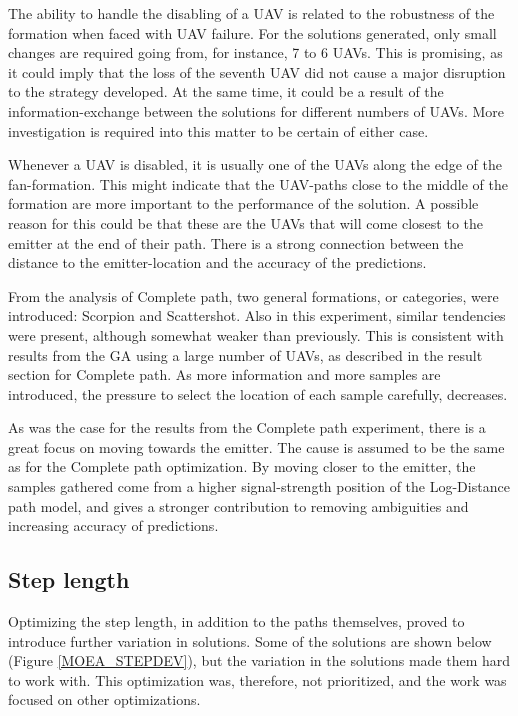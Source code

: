 \documentclass[10pt,a4paper]{book}
\begin{document}
The ability to handle the disabling of a \gls{UAV} is related to the robustness of the formation when faced with \gls{UAV} failure. For the solutions generated, only small changes are required going from, for instance, 7 to 6 \glspl{UAV}. This is promising, as it could imply that the loss of the seventh \gls{UAV} did not cause a major disruption to the strategy developed. At the same time, it could be a result of the information-exchange between the solutions for different numbers of \glspl{UAV}. More investigation is required into this matter to be certain of either case. 

Whenever a \gls{UAV} is disabled, it is usually one of the \glspl{UAV} along the edge of the fan-formation. This might indicate that the \gls{UAV}-paths close to the middle of the formation are more important to the performance of the solution. A possible reason for this could be that these are the \glspl{UAV} that will come closest to the emitter at the end of their path. There is a strong connection between the distance to the emitter-location and the accuracy of the predictions. 

From the analysis of Complete path, two general formations, or categories, were introduced: Scorpion and Scattershot. Also in this experiment, similar tendencies were present, although somewhat weaker than previously. This is consistent with results from the \gls{GA} using a large number of \glspl{UAV}, as described in the result section for Complete path. As more information and more samples are introduced, the pressure to select the location of each sample carefully, decreases. 

As was the case for the results from the Complete path experiment, there is a great focus on moving towards the emitter. The cause is assumed to be the same as for the Complete path optimization. By moving closer to the emitter, the samples gathered come from a higher signal-strength position of the Log-Distance path model, and gives a stronger contribution to removing ambiguities and increasing accuracy of predictions.


\subsection{Step length}

Optimizing the step length, in addition to the paths themselves, proved to introduce further variation in solutions. Some of the solutions are shown below (Figure \ref{MOEA_STEPDEV}), but the variation in the solutions made them hard to work with. This optimization was, therefore, not prioritized, and the work was focused on other optimizations.
\end{document}
